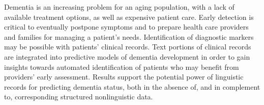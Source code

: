 Dementia is an increasing problem for an aging population, with a lack of available treatment options, as well as expensive patient care. Early detection is critical to eventually postpone symptoms and to prepare health care providers and families for managing a patient's needs. Identification of diagnostic markers may be possible with patients' clinical records. Text portions of clinical records are integrated into predictive models of dementia development in order to gain insights towards automated identification of patients who may benefit from providers' early assessment. Results support the potential power of linguistic records for predicting dementia status, both in the absence of, and in complement to, corresponding structured nonlinguistic data.
